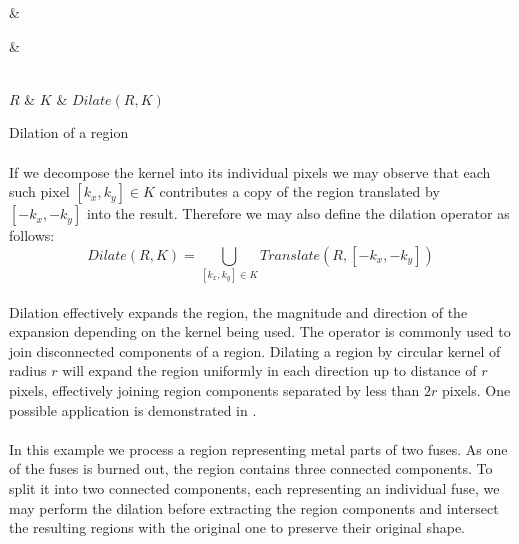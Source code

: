 \newarray\dilationResult
{}

\begin{table}[h]
\centering
{}

 &
 &

\\

$R$ &
$K$ &
$Dilate(R,K)$

\endtabular
\caption{Dilation of a region}
\label{tab:RegionDilation}
\end{table}

\paragraph*{}
If we decompose the kernel into its individual pixels we may observe that each such pixel $[k_x, k_y] \in K$ contributes a copy of the region translated by $[-k_x, -k_y]$ into the result. Therefore we may also define the dilation operator as follows:
\[
	Dilate(R,K) = \bigcup_{[k_x, k_y] \in K} Translate(R, [-k_x, -k_y])
\]

\paragraph*{}
Dilation effectively expands the region, the magnitude and direction of the expansion depending on the kernel being used. The operator is commonly used to join disconnected components of a region. Dilating a region by circular kernel of radius $r$ will expand the region uniformly in each direction up to distance of $r$ pixels, effectively joining region components separated by less than $2r$ pixels. One possible application is demonstrated in .

\paragraph*{}
In this example we process a region representing metal parts of two fuses. As one of the fuses is burned out, the region contains three connected components. To split it into two connected components, each representing an individual fuse, we may perform the dilation before extracting the region components and intersect the resulting regions with the original one to preserve their original shape.

